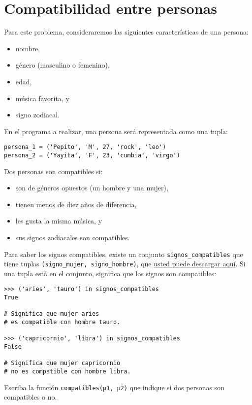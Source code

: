 \section{Compatibilidad entre personas}

Para este problema, consideraremos las siguientes características de una
persona:

\begin{itemize}
  \item nombre,
  \item género (masculino o femenino),
  \item edad,
  \item música favorita, y
  \item signo zodiacal.
\end{itemize}

En el programa a realizar, una persona será representada como una tupla:

\begin{lstlisting}
persona_1 = ('Pepito', 'M', 27, 'rock', 'leo')
persona_2 = ('Yayita', 'F', 23, 'cumbia', 'virgo')
\end{lstlisting}

Dos personas son compatibles si:

\begin{itemize}
\item
  son de géneros opuestos (un hombre y una mujer),
\item
  tienen menos de diez años de diferencia,
\item
  les gusta la misma música, y
\item
  sus signos zodiacales son compatibles.
\end{itemize}

Para saber los signos compatibles, existe un conjunto
\lstinline!signos_compatibles! que tiene tuplas
\lstinline!(signo_mujer, signo_hombre)!, que
\href{../../\_static/signos.py}{usted puede descargar aquí}. Si una
tupla está en el conjunto, significa que los signos son compatibles:

\begin{lstlisting}
>>> ('aries', 'tauro') in signos_compatibles
True

# Significa que mujer aries
# es compatible con hombre tauro.

>>> ('capricornio', 'libra') in signos_compatibles
False

# Significa que mujer capricornio
# no es compatible con hombre libra.
\end{lstlisting}

Escriba la función \lstinline!compatibles(p1, p2)! que indique si dos
personas son compatibles o no.
